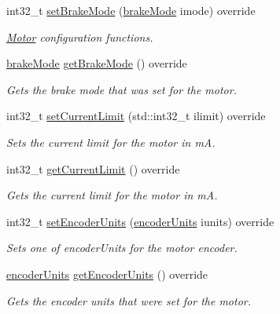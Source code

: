 \begin{DoxyCompactItemize}
int32\+\_\+t \mbox{\hyperlink{classokapi_1_1ThreadedMockMotor_a77560a5d50838cd289c41bb1c0a73454}{set\+Brake\+Mode}} (\mbox{\hyperlink{classokapi_1_1AbstractMotor_a132e0485dbb59a60c3f934338d8fa601}{brake\+Mode}} imode) override
\begin{DoxyCompactList}\small\item\em \mbox{\hyperlink{classokapi_1_1Motor}{Motor}} configuration functions. \end{DoxyCompactList}\item 
\mbox{\hyperlink{classokapi_1_1AbstractMotor_a132e0485dbb59a60c3f934338d8fa601}{brake\+Mode}} \mbox{\hyperlink{classokapi_1_1ThreadedMockMotor_a26629d3a25e6b921996c9350221f0290}{get\+Brake\+Mode}} () override
\begin{DoxyCompactList}\small\item\em Gets the brake mode that was set for the motor. \end{DoxyCompactList}\item 
int32\+\_\+t \mbox{\hyperlink{classokapi_1_1ThreadedMockMotor_a718e4336bdc0fd8077abda0773045226}{set\+Current\+Limit}} (std\+::int32\+\_\+t ilimit) override
\begin{DoxyCompactList}\small\item\em Sets the current limit for the motor in mA. \end{DoxyCompactList}\item 
int32\+\_\+t \mbox{\hyperlink{classokapi_1_1ThreadedMockMotor_a89ce5e19d25c433f1ff50cc9fa9dc197}{get\+Current\+Limit}} () override
\begin{DoxyCompactList}\small\item\em Gets the current limit for the motor in mA. \end{DoxyCompactList}\item 
int32\+\_\+t \mbox{\hyperlink{classokapi_1_1ThreadedMockMotor_a34c1e91ed83b0dc293a5ed0478f4d28d}{set\+Encoder\+Units}} (\mbox{\hyperlink{classokapi_1_1AbstractMotor_ae811cd825099f2defadeb1b7f7e7764c}{encoder\+Units}} iunits) override
\begin{DoxyCompactList}\small\item\em Sets one of encoder\+Units for the motor encoder. \end{DoxyCompactList}\item 
\mbox{\hyperlink{classokapi_1_1AbstractMotor_ae811cd825099f2defadeb1b7f7e7764c}{encoder\+Units}} \mbox{\hyperlink{classokapi_1_1ThreadedMockMotor_accb7380643229416e5f6b7a5d0847c9d}{get\+Encoder\+Units}} () override
\begin{DoxyCompactList}\small\item\em Gets the encoder units that were set for the motor. \end{DoxyCompactList}\item 

\end{DoxyCompactItemize}
